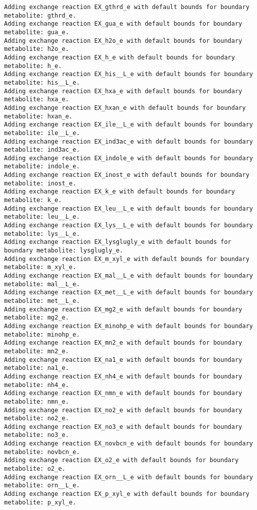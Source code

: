 \documentclass[
  letterpaper,
  DIV=11,
  numbers=noendperiod]{scrartcl}
\begin{document}
\begin{verbatim}
Adding exchange reaction EX_gthrd_e with default bounds for boundary metabolite: gthrd_e.
Adding exchange reaction EX_gua_e with default bounds for boundary metabolite: gua_e.
Adding exchange reaction EX_h2o_e with default bounds for boundary metabolite: h2o_e.
Adding exchange reaction EX_h_e with default bounds for boundary metabolite: h_e.
Adding exchange reaction EX_his__L_e with default bounds for boundary metabolite: his__L_e.
Adding exchange reaction EX_hxa_e with default bounds for boundary metabolite: hxa_e.
Adding exchange reaction EX_hxan_e with default bounds for boundary metabolite: hxan_e.
Adding exchange reaction EX_ile__L_e with default bounds for boundary metabolite: ile__L_e.
Adding exchange reaction EX_ind3ac_e with default bounds for boundary metabolite: ind3ac_e.
Adding exchange reaction EX_indole_e with default bounds for boundary metabolite: indole_e.
Adding exchange reaction EX_inost_e with default bounds for boundary metabolite: inost_e.
Adding exchange reaction EX_k_e with default bounds for boundary metabolite: k_e.
Adding exchange reaction EX_leu__L_e with default bounds for boundary metabolite: leu__L_e.
Adding exchange reaction EX_lys__L_e with default bounds for boundary metabolite: lys__L_e.
Adding exchange reaction EX_lysglugly_e with default bounds for boundary metabolite: lysglugly_e.
Adding exchange reaction EX_m_xyl_e with default bounds for boundary metabolite: m_xyl_e.
Adding exchange reaction EX_mal__L_e with default bounds for boundary metabolite: mal__L_e.
Adding exchange reaction EX_met__L_e with default bounds for boundary metabolite: met__L_e.
Adding exchange reaction EX_mg2_e with default bounds for boundary metabolite: mg2_e.
Adding exchange reaction EX_minohp_e with default bounds for boundary metabolite: minohp_e.
Adding exchange reaction EX_mn2_e with default bounds for boundary metabolite: mn2_e.
Adding exchange reaction EX_na1_e with default bounds for boundary metabolite: na1_e.
Adding exchange reaction EX_nh4_e with default bounds for boundary metabolite: nh4_e.
Adding exchange reaction EX_nmn_e with default bounds for boundary metabolite: nmn_e.
Adding exchange reaction EX_no2_e with default bounds for boundary metabolite: no2_e.
Adding exchange reaction EX_no3_e with default bounds for boundary metabolite: no3_e.
Adding exchange reaction EX_novbcn_e with default bounds for boundary metabolite: novbcn_e.
Adding exchange reaction EX_o2_e with default bounds for boundary metabolite: o2_e.
Adding exchange reaction EX_orn__L_e with default bounds for boundary metabolite: orn__L_e.
Adding exchange reaction EX_p_xyl_e with default bounds for boundary metabolite: p_xyl_e.

\end{verbatim}
\end{document}
